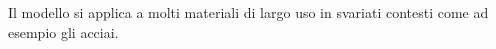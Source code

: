 Il modello si applica a molti materiali di largo uso in svariati contesti come ad esempio gli acciai.




